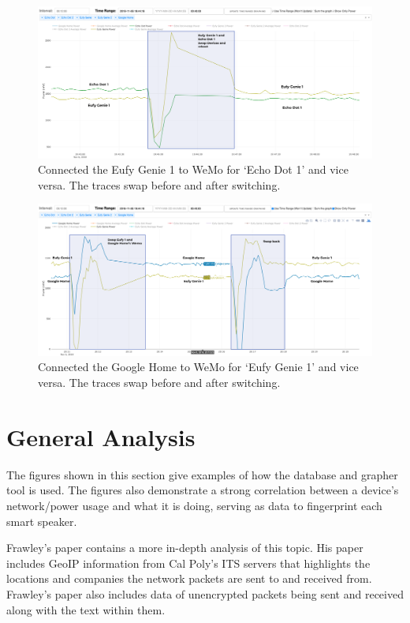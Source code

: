 \begin{figure}[H]
    \centering
    \includegraphics[width=1\textwidth]{figures/swapEufy1Echo1.png}
    \caption{Connected the Eufy Genie 1 to WeMo for `Echo Dot 1' and vice versa. The traces swap before and after switching.}
    \label{fig:swapEufy1Echo1}
\end{figure}

\begin{figure}[H]
    \centering
    \includegraphics[width=1\textwidth]{figures/swapEufy1Home.png}
    \caption{Connected the Google Home to WeMo for `Eufy Genie 1' and vice versa. The traces swap before and after switching.}
    \label{fig:swapEufy1Home}
\end{figure}

\section{General Analysis}
\label{General Analysis}
The figures shown in this section give examples of how the database and grapher tool is used. The figures also demonstrate a strong correlation between a device's network/power usage and what it is doing, serving as data to fingerprint each smart speaker.

Frawley's paper contains a more in-depth analysis of this topic. His paper includes GeoIP \cite{maxmind} information from Cal Poly's ITS servers \cite{its} that highlights the locations and companies the network packets are sent to and received from. Frawley's paper also includes data of unencrypted packets being sent and received along with the text within them.

